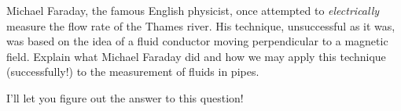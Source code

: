 

Michael Faraday, the famous English physicist, once attempted to {\it electrically} measure the flow rate of the Thames river.  His technique, unsuccessful as it was, was based on the idea of a fluid conductor moving perpendicular to a magnetic field.  Explain what Michael Faraday did and how we may apply this technique (successfully!) to the measurement of fluids in pipes.







I'll let you figure out the answer to this question!











